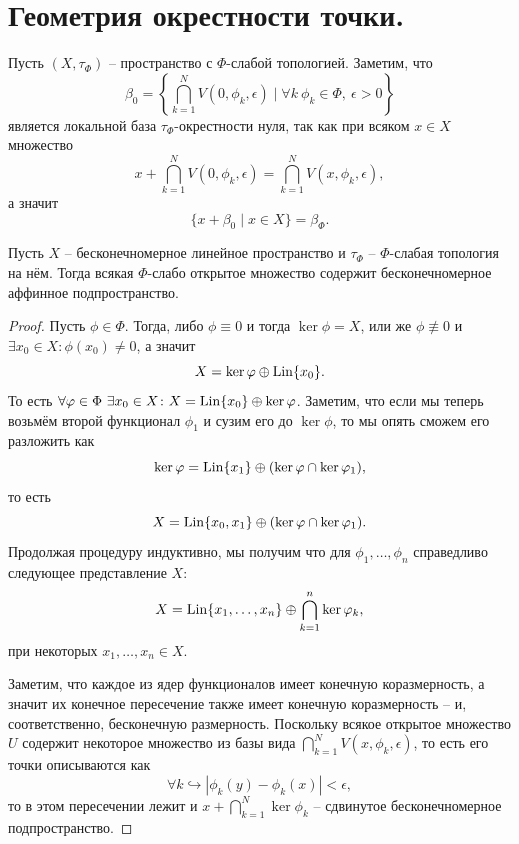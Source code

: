 \section{Геометрия окрестности точки.}
\begin{note}
    Пусть $(X, \tau_{\Phi})$ -- пространство с $\Phi$-слабой топологией.
    Заметим, что
    \[
        \beta_0 = \left\{\bigcap_{k = 1}^{N} V(0, \phi_k, \epsilon) \mid \forall k \ \phi_k \in \Phi, \ \epsilon > 0\right\}
    \]
    является локальной база $\tau_{\Phi}$-окрестности нуля, так как при всяком $x \in X$
    множество
    \[
        x + \bigcap_{k = 1}^{N} V(0, \phi_k, \epsilon) = \bigcap_{k = 1}^{N} V(x, \phi_k, \epsilon),
    \]
    а значит
    \[
        \{x + \beta_0\mid x \in X\} = \beta_{\Phi}.
    \]
\end{note} %
\begin{proposition}\label{prop:infdim-subspace}
    Пусть $X$ -- бесконечномерное линейное пространство и $\tau_{\Phi}$ -- $\Phi$-слабая топология на нём.
    Тогда всякая $\Phi$-слабо открытое множество содержит бесконечномерное аффинное подпространство.
\end{proposition}
\begin{proof}
    Пусть $\phi \in \Phi$.
    Тогда, либо $\phi \equiv 0$ и тогда $\ker \phi = X$, или же $\phi \not\equiv 0$ и $\exists x_0 \in X\colon \phi(x_0) \neq 0$, а значит
    \[
        X = \ker \varphi \oplus \operatorname{Lin}\{x_0\}.
    \]
    То есть $\forall \varphi \in \Phi \ \exists x_0 \in X\colon X = \operatorname{Lin}\{x_0\} \oplus \ker \varphi$.
    Заметим, что если мы теперь возьмём второй функционал $\phi_1$ и сузим его до $\ker \phi$, то мы опять сможем его разложить как
    \[
        \ker \varphi = \operatorname{Lin}\{x_1\} \oplus (\ker \varphi \cap \ker \varphi_1),
    \]
    то есть
    \[
        X = \operatorname{Lin}\{x_0, x_1\} \oplus (\ker \varphi \cap \ker \varphi_1).
    \]
    Продолжая процедуру индуктивно, мы получим что для $\phi_1, \ldots, \phi_n$ справедливо следующее представление $X\colon$
    \[
        X = \operatorname{Lin}\{x_1, \ldots, x_n\} \oplus \bigcap_{k = 1}^{n} \ker \varphi_k,
    \]
    при некоторых $x_1, \ldots, x_n \in X$.

    Заметим, что каждое из ядер функционалов имеет конечную коразмерность, а значит их конечное пересечение также имеет конечную коразмерность -- и, соответственно, бесконечную размерность.
    Поскольку всякое открытое множество $U$ содержит некоторое множество из базы вида $\bigcap_{k = 1}^{N} V(x, \phi_k, \epsilon)$, то есть его точки описываются как
    \[
        \forall k \hookrightarrow |\phi_k(y) - \phi_k(x)| < \epsilon,
    \]
    то в этом пересечении лежит и $x + \bigcap_{k = 1}^{N} \ker \phi_k$ -- сдвинутое бесконечномерное подпространство.
\end{proof}
